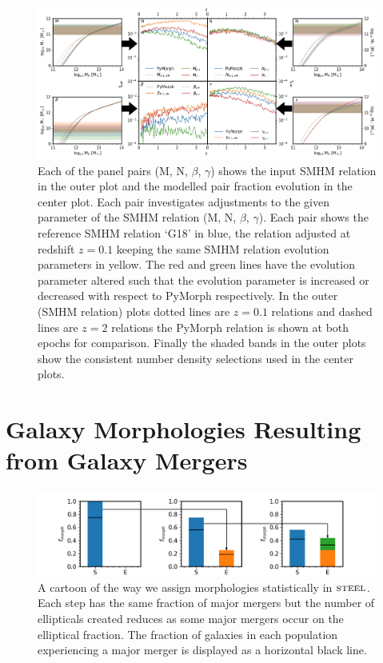 \begin{landscape}
\begingroup
\begin{figure}[h]
	\centering
	\includegraphics[width = \linewidth]{Figures/Chapter5/PairFractionSystematic.png}
	\caption{Each of the panel pairs (M, N, $\beta$, $\gamma$) shows the input SMHM relation in the outer plot and the modelled pair fraction evolution in the center plot. Each pair investigates adjustments to the given parameter of the SMHM relation (M, N, $\beta$, $\gamma$). Each pair shows the reference SMHM relation `G18' in blue, the relation adjusted at redshift $z = 0.1$ keeping the same SMHM relation evolution parameters in yellow. The red and green lines have the evolution parameter altered such that the evolution parameter is increased or decreased with respect to PyMorph respectively. In the outer (SMHM relation) plots dotted lines are $z = 0.1$ relations and dashed lines are $z = 2$ relations the PyMorph relation is shown at both epochs for comparison. Finally the shaded bands in the outer plots show the consistent number density selections used in the center plots.}
	\label{fig:Pair_Frac_Sys}
\end{figure}
\endgroup
\end{landscape}

\section{Galaxy Morphologies Resulting from Galaxy Mergers}

\begin{figure}[h]
	\centering
	\includegraphics[width = \linewidth]{Figures/Chapter5/Morphology_Evolution.png}
	\caption{A cartoon of the way we assign morphologies statistically in $\textsc{steel}$. Each step has the same fraction of major mergers but the number of ellipticals created reduces as some major mergers occur on the elliptical fraction. The fraction of galaxies in each population experiencing a major merger is displayed as a horizontal black line.}
	\label{fig:Gal_Morph}
\end{figure}


